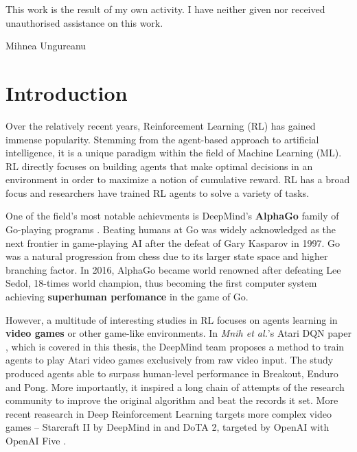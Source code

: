 \documentclass[12pt,twoside]{report}
\begin{document}
\hfill \break
This work is the result of my own activity. I have neither given nor received unauthorised assistance on this work.
\begin{flushright}
    Mihnea Ungureanu
\end{flushright}


\tableofcontents


\chapter{Introduction}
Over the relatively recent years, Reinforcement Learning (RL) has gained immense popularity.
Stemming from the agent-based approach to artificial intelligence, it is a unique paradigm within the field of Machine Learning (ML).
RL directly focuses on building agents that make optimal decisions in an environment in order to maximize a notion of cumulative reward.
RL has a broad focus and researchers have trained RL agents to solve a variety of tasks.

One of the field's most notable achievments is DeepMind's \textbf{AlphaGo} family of Go-playing programs \cite{ago, alpha-zero}.
Beating humans at Go was widely acknowledged as the next frontier in game-playing AI after the defeat of Gary Kasparov in 1997\footnotemark.
Go was a natural progression from chess due to its larger state space and higher branching factor.
In 2016, AlphaGo became world renowned after defeating Lee Sedol, 18-times world champion, thus becoming the first computer system achieving \textbf{superhuman perfomance} in the game of Go.

However, a multitude of interesting studies in RL focuses on agents learning in \textbf{video games} or other game-like environments.
In \emph{Mnih et al.}'s Atari DQN paper \cite{atari-dqn}, which is covered in this thesis, the DeepMind team proposes a method to train agents to play Atari video games exclusively from raw video input.
The study produced agents able to surpass human-level performance in Breakout, Enduro and Pong.
More importantly, it inspired a long chain of attempts of the research community to improve the original algorithm and beat the records it set.
More recent reasearch in Deep Reinforcement Learning targets more complex video games -- Starcraft II by DeepMind in \cite{starcraft-le-paper} and DoTA 2, targeted by OpenAI with OpenAI Five \cite{openai-five-paper}.
\end{document}
